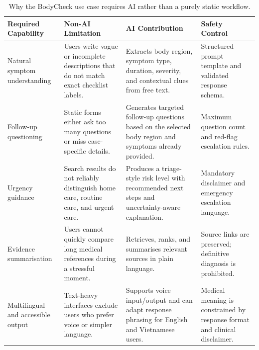 \begin{table}[htbp]
  \centering
  \caption{Why the BodyCheck use case requires AI rather than a purely static workflow.}
  \label{tab:why-ai}
  \setlength{\tabcolsep}{5pt}
  \renewcommand{\arraystretch}{1.45}
  \small
  \begin{tabular}{@{} p{3.0cm} p{4.0cm} p{4.4cm} p{4cm} @{}}
    \toprule
    \textbf{Required Capability} &
    \textbf{Non-AI Limitation} &
    \textbf{AI Contribution} &
    \textbf{Safety Control} \\
    \midrule

    Natural symptom understanding &
    Users write vague or incomplete descriptions that do not match exact
    checklist labels. &
    Extracts body region, symptom type, duration, severity, and contextual
    clues from free text. &
    Structured prompt template and validated response schema. \\

    Follow-up questioning &
    Static forms either ask too many questions or miss case-specific details. &
    Generates targeted follow-up questions based on the selected body region
    and symptoms already provided. &
    Maximum question count and red-flag escalation rules. \\

    Urgency guidance &
    Search results do not reliably distinguish home care, routine care, and
    urgent care. &
    Produces a triage-style risk level with recommended next steps and
    uncertainty-aware explanation. &
    Mandatory disclaimer and emergency escalation language. \\

    Evidence summarisation &
    Users cannot quickly compare long medical references during a stressful
    moment. &
    Retrieves, ranks, and summarises relevant sources in plain language. &
    Source links are preserved; definitive diagnosis is prohibited. \\

    Multilingual and accessible output &
    Text-heavy interfaces exclude users who prefer voice or simpler language. &
    Supports voice input/output and can adapt response phrasing for English
    and Vietnamese users. &
    Medical meaning is constrained by response format and clinical disclaimer. \\

    \bottomrule
  \end{tabular}
\end{table}
